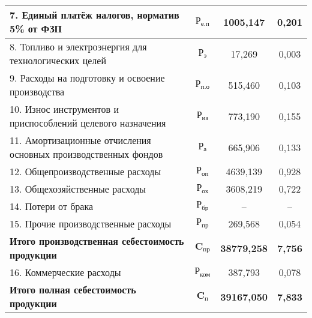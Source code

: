 {\begin{longtable}{| m{10.7cm} | c | c | c |}
      7. Единый платёж налогов, норматив 5\% от ФЗП
      & \( \text{Р}_{\text{е.п}} \) & 1005{,}147 & 0{,}201 \\
      \hline

      8. Топливо и электроэнергия для технологических целей
      & \( \text{Р}_{\text{э}} \) & 17{,}269 & 0{,}003 \\
      \hline

      9. Расходы на подготовку и освоение производства
      & \( \text{Р}_{\text{п.о}} \) & 515{,}460 & 0{,}103 \\
      \hline

      10. Износ инструментов и приспособлений \newline
      целевого назначения
      & \( \text{Р}_{\text{из}} \) & 773{,}190 & 0{,}155 \\
      \hline

      11. Амортизационные отчисления основных \newline 
      производственных фондов
      & \( \text{Р}_{\text{а}} \) & 665{,}906 & 0{,}133 \\
      \hline

      12. Общепроизводственные расходы
      & \( \text{Р}_{\text{оп}} \) & 4639{,}139 & 0{,}928 \\
      \hline

      13. Общехозяйственные расходы
      & \( \text{Р}_{\text{ох}} \) & 3608{,}219 & 0{,}722 \\
      \hline

      14. Потери от брака
      & \( \text{Р}_{\text{бр}} \) & -- & -- \\
      \hline

      15. Прочие производственные расходы
      & \( \text{Р}_{\text{пр}} \) & 269{,}568 & 0{,}054 \\
      \hline

      \textbf{Итого \newline производственная себестоимость продукции}
      & \( \mathbf{C_{\text{пр}}} \) & \textbf{38779{,}258} & \textbf{7{,}756} \\
      \hline

      16. Коммерческие расходы
      & \( \text{Р}_{\text{ком}} \) & 387{,}793 & 0{,}078 \\
      \hline

      \textbf{Итого \newline полная себестоимость продукции}
      & \( \mathbf{C_{\text{п}}} \) & \textbf{39167{,}050} & \textbf{7{,}833} \\
      \hline


\end{longtable}}
